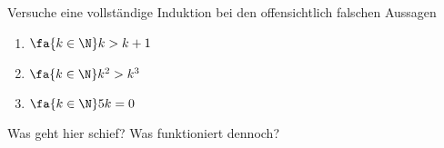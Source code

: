 \begin{exercise}
  Versuche eine vollständige Induktion bei den offensichtlich falschen Aussagen
  \begin{enumerate}
  \item $\fa{k \in \N} k > k + 1$
  \item $\fa{k \in \N} k^2 > k^3$
  \item $\fa{k \in \N} 5k = 0$
  \end{enumerate}
  Was geht hier schief? Was funktioniert dennoch?
\end{exercise}
